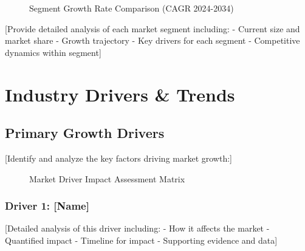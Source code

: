 \documentclass[11pt,letterpaper]{report}
\begin{document}

\begin{figure}[htbp]
\centering
\caption{Segment Growth Rate Comparison (CAGR 2024-2034)}
\label{fig:segment_growth}
\end{figure}

[Provide detailed analysis of each market segment including:
- Current size and market share
- Growth trajectory
- Key drivers for each segment
- Competitive dynamics within segment]

\chapter{Industry Drivers \& Trends}

\section{Primary Growth Drivers}

[Identify and analyze the key factors driving market growth:]


\begin{figure}[htbp]
\centering
\caption{Market Driver Impact Assessment Matrix}
\label{fig:driver_matrix}
\end{figure}

\subsection{Driver 1: [Name]}
[Detailed analysis of this driver including:
- How it affects the market
- Quantified impact
- Timeline for impact
- Supporting evidence and data]
\end{document}
